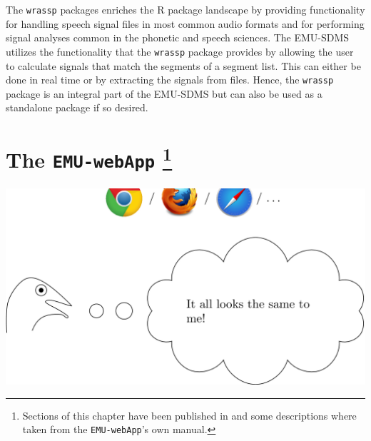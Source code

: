 \documentclass[]{book}
\let\rmarkdownfootnote\footnote%
\def\footnote{\protect\rmarkdownfootnote}
\theoremstyle{definition}
\theoremstyle{definition}
\theoremstyle{definition}
\theoremstyle{remark}
\begin{document}
The \texttt{wrassp} packages enriches the R package landscape by
providing functionality for handling speech signal files in most common
audio formats and for performing signal analyses common in the phonetic
and speech sciences. The EMU-SDMS utilizes the functionality that the
\texttt{wrassp} package provides by allowing the user to calculate
signals that match the segments of a segment list. This can either be
done in real time or by extracting the signals from files. Hence, the
\texttt{wrassp} package is an integral part of the EMU-SDMS but can also
be used as a standalone package if so desired.

\hypertarget{chap:emu-webApp}{%
\chapter[The \texttt{EMU-webApp} ]{\texorpdfstring{The
\texttt{EMU-webApp} \footnote{Sections of this chapter have been
  published in \citep{winkelmann:2015d} and some descriptions where
  taken from the \texttt{EMU-webApp}'s own manual.}}{The EMU-webApp }}\label{chap:emu-webApp}}

\begin{center}\includegraphics[width=0.75\linewidth]{pics/EMU-webAppEmu_emu-webApp} \end{center}
\end{document}
